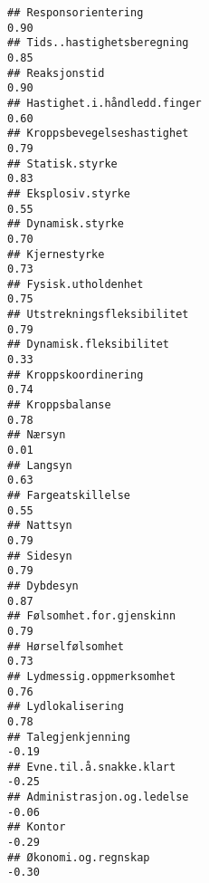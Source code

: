 \documentclass[
]{article}
\begin{document}
\begin{verbatim}
## Responsorientering                                                                0.90
## Tids..hastighetsberegning                                                         0.85
## Reaksjonstid                                                                      0.90
## Hastighet.i.håndledd.finger                                                       0.60
## Kroppsbevegelseshastighet                                                         0.79
## Statisk.styrke                                                                    0.83
## Eksplosiv.styrke                                                                  0.55
## Dynamisk.styrke                                                                   0.70
## Kjernestyrke                                                                      0.73
## Fysisk.utholdenhet                                                                0.75
## Utstrekningsfleksibilitet                                                         0.79
## Dynamisk.fleksibilitet                                                            0.33
## Kroppskoordinering                                                                0.74
## Kroppsbalanse                                                                     0.78
## Nærsyn                                                                            0.01
## Langsyn                                                                           0.63
## Fargeatskillelse                                                                  0.55
## Nattsyn                                                                           0.79
## Sidesyn                                                                           0.79
## Dybdesyn                                                                          0.87
## Følsomhet.for.gjenskinn                                                           0.79
## Hørselfølsomhet                                                                   0.73
## Lydmessig.oppmerksomhet                                                           0.76
## Lydlokalisering                                                                   0.78
## Talegjenkjenning                                                                 -0.19
## Evne.til.å.snakke.klart                                                          -0.25
## Administrasjon.og.ledelse                                                        -0.06
## Kontor                                                                           -0.29
## Økonomi.og.regnskap                                                              -0.30

\end{verbatim}
\end{document}
